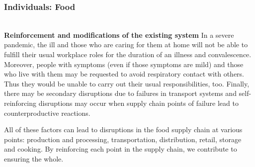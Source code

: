 \documentclass[12pt, a4]{scrartcl}
\begin{document}
\subsubsection{Individuals: Food}
\\
\textbf{Reinforcement and modifications of the existing system}
In a severe pandemic, the ill and those who are caring for them at home will not be able to fulfill their usual workplace roles for the duration of an illness and convalescence. Moreover, people with symptoms (even if those symptoms are mild) and those who live with them may be requested to avoid respiratory contact with others. Thus they would be unable to carry out their usual responsibilities, too. Finally, there may be secondary disruptions due to failures in transport systems and self-reinforcing disruptions may occur when supply chain points of failure lead to counterproductive reactions. 

All of these factors can lead to disruptions in the food supply chain at various points: production and processing, transportation, distribution, retail, storage and cooking. By reinforcing each point in the supply chain, we contribute to ensuring the whole.
\end{document}
